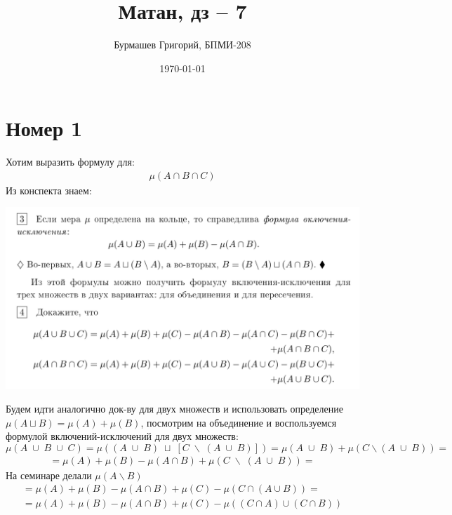 \documentclass[a4paper,12pt]{article}
\author{Бурмашев Григорий, БПМИ-208}
\title{Матан, дз -- 7}
\date{\today}
\begin{document}
\maketitle
\section*{Номер 1}
Хотим выразить формулу для:
 \begin{equation*}
\begin{gathered}
\mu(A \cap  B \cap  C)
\end{gathered}
\end{equation*}
Из конспекта знаем:
\begin{center}
\includegraphics[scale=0.3]{1.png}
\end{center}
Будем идти аналогично док-ву для двух множеств и использовать определение $\mu(A \sqcup B) = \mu(A) + \mu(B)$, посмотрим на объединение и воспользуемся формулой включений-исключений для двух множеств:
\[
\mu(A \; \cup \; B \; \cup \; C) = \mu ((A \; \cup \;B) \;\sqcup \; \left[C\; \backslash \; (A \; \cup \;  B)\right]) = \mu(A \; \cup \;  B) + \mu (C \backslash (A \; \cup \; B)) = 
\]
\begin{equation*}
\begin{gathered}
= \mu(A) + \mu(B) - \mu(A \cap B)+ \mu (C\; \backslash\; (A \; \cup \; B)) =
\end{gathered}
\end{equation*}
На семинаре делали $\mu(A \backslash B)$
\begin{equation*}
\begin{gathered}
=
\mu(A) + \mu(B) - \mu(A \cap B) + \mu(C) - \mu(C \cap (A \cup B)) =
\\
=
 \mu(A) + \mu(B) - \mu(A \cap B) + \mu(C) - \mu((C \cap A) \cup (C \cap B))
\end{gathered}
\end{equation*}
\end{document}
